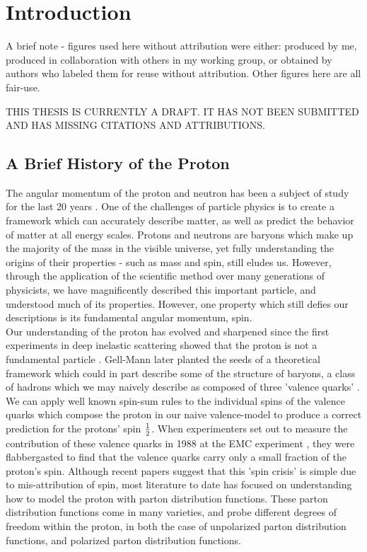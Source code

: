 \chapter{Introduction}

A brief note - figures used here without attribution were either: produced by
me, produced in collaboration with others in my working group, or obtained by
authors who labeled them for reuse without attribution. Other figures here are
all fair-use.

THIS THESIS IS CURRENTLY A DRAFT. IT HAS NOT BEEN SUBMITTED AND HAS MISSING
CITATIONS AND ATTRIBUTIONS. 

\section{A Brief History of the Proton}
The angular momentum of the proton and neutron has been a subject of study for the last 20
years \needcite{}. One of the challenges of particle physics is to create a
framework which can accurately describe matter, as well as predict the behavior
of matter at all energy scales. Protons and neutrons are baryons which make up
the majority of the mass in the visible universe, yet fully understanding the
origins of their properties - such as  mass and spin, still eludes us. However,
through the application of the scientific method over many generations of
physicists, we have magnificently described this important particle, and
understood much of its properties. However, one property which still defies our
descriptions is its fundamental angular momentum, spin. \\
	
Our understanding of the proton has evolved and sharpened since the first
experiments in deep inelastic scattering showed that the proton is not a
fundamental particle \cite{Breidenbach1969}. Gell-Mann later planted the
seeds of a theoretical framework which could in part describe some of the
structure of baryons, a class of hadrons which we may naively describe as
composed of three 'valence quarks' \needcite{}. We can apply well known spin-sum
rules to the individual spins of the valence quarks which compose the proton in
our naive valence-model to produce a correct prediction for the protons' spin
${1}\over{2}$. When experimenters set out to measure the contribution of these
valence quarks in 1988 at the EMC experiment \cite{Ashman1988}, they
were flabbergasted to find that the valence quarks carry only a small fraction
of the proton's spin. Although recent papers \cite{Povh2016} suggest that this 'spin
crisis' is simple due to mis-attribution of spin, most literature to date has
focused on understanding how to model the proton with parton distribution
functions. These parton distribution functions come in many varieties, and probe
different degrees of freedom within the proton, in both the case of unpolarized
parton distribution functions, and polarized parton distribution functions. \\
 
